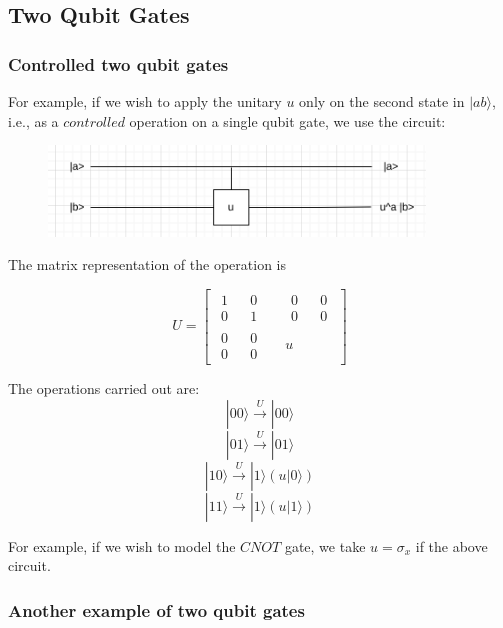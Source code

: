 \documentclass{article}
\begin{document}
\subsection{Two Qubit Gates}

\subsubsection{Controlled two qubit gates}

For example, if we wish to apply the unitary $u$ only on the second state in $|ab\rangle$, i.e., as a $controlled$ operation on a single qubit gate, we use the circuit:

\begin{figure}[htp]
    \centering
    \includegraphics[width=10cm]{twoqubit.png}
\end{figure}

The matrix representation of the operation is

$$
    U = \begin{bmatrix}
        \begin{matrix}
            1 && 0\\
            0 && 1
        \end{matrix}
        && 
        \begin{matrix}
            0 && 0\\
            0 && 0
        \end{matrix}
        \\
        \begin{matrix}
            0 && 0\\
            0 && 0
        \end{matrix}
        && 
        u
    \end{bmatrix}
$$

The operations carried out are:
$$|00\rangle \xrightarrow[]{U} |00\rangle$$
$$|01\rangle \xrightarrow[]{U} |01\rangle$$
$$|10\rangle \xrightarrow[]{U} |1\rangle(u|0\rangle)$$
$$|11\rangle \xrightarrow[]{U} |1\rangle(u|1\rangle)$$

For example, if we wish to model the $CNOT$ gate, we take $u=\sigma _x$ if the above circuit.

\subsubsection{Another example of two qubit gates}
\end{document}
